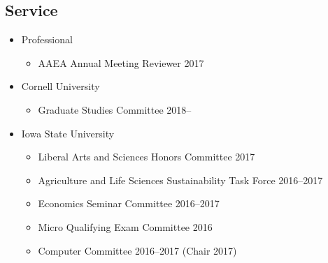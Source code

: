 \documentclass{res} %
\begin{document}
\begin{resume}
\section{Service}
\begin{itemize}
	\item[] Professional
	\vspace{-0.05in}
	\begin{itemize}
		\item[] AAEA Annual Meeting Reviewer \hfill 2017
	\end{itemize}
	\item[] Cornell University
	\vspace{-0.05in}
	\begin{itemize} \itemsep -1pt
		\item[]	Graduate Studies Committee \hfill 2018--
	\end{itemize}
	\item[] Iowa State University
	\vspace{-0.05in}
	\begin{itemize} \itemsep -1pt
		\item[]	Liberal Arts and Sciences Honors Committee \hfill 2017
		\item[] Agriculture and Life Sciences Sustainability Task Force \hfill 2016--2017
		\item[] Economics Seminar Committee \hfill 2016--2017
		\item[] Micro Qualifying Exam Committee \hfill 2016
		\item[] Computer Committee \hfill 2016--2017 (Chair 2017)
	\end{itemize}
\end{itemize}
\vspace{-.075in}



\end{resume}
\end{document}
